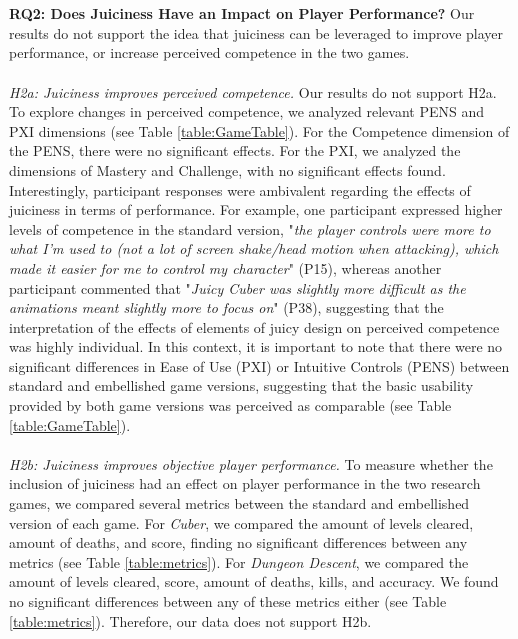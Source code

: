 \documentclass{sigchi}
\begin{document}
\\\\
\textbf{RQ2: Does Juiciness Have an Impact on Player Performance?}
Our results do not support the idea that juiciness can be leveraged to improve player performance, or increase perceived competence in the two games. 
\\\\
\textit{H2a: Juiciness improves perceived competence.}
Our results do not support H2a. To explore changes in perceived competence, we analyzed relevant PENS and PXI dimensions (see Table \ref{table:GameTable}). For the Competence dimension of the PENS, there were no significant effects. For the PXI, we analyzed the dimensions of Mastery and Challenge, with no significant effects found. Interestingly, participant responses were ambivalent regarding the effects of juiciness in terms of performance. For example, one participant expressed higher levels of competence in the standard version, "\textit{the player controls were more to what I'm used to (not a lot of screen shake/head motion when attacking), which made it easier for me to control my character}" (P15), whereas another participant commented that "\textit{Juicy Cuber was slightly more difficult as the animations meant slightly more to focus on}" (P38), suggesting that the interpretation of the effects of elements of juicy design on perceived competence was highly individual. In this context, it is important to note that there were no significant differences in Ease of Use (PXI) or Intuitive Controls (PENS) between standard and embellished game versions, suggesting that the basic usability provided by both game versions was perceived as comparable (see Table \ref{table:GameTable}).
\\\\
\textit{H2b: Juiciness improves objective player performance.}
To measure whether the inclusion of juiciness had an effect on player performance in the two research games, we compared several metrics between the standard and embellished version of each game. For \textit{Cuber}, we compared the amount of levels cleared, amount of deaths, and score, finding no significant differences between any metrics (see Table \ref{table:metrics}). For \textit{Dungeon Descent}, we compared the amount of levels cleared, score, amount of deaths, kills, and accuracy. We found no significant differences between any of these metrics either (see Table \ref{table:metrics}). Therefore, our data does not support H2b. 
\end{document}
